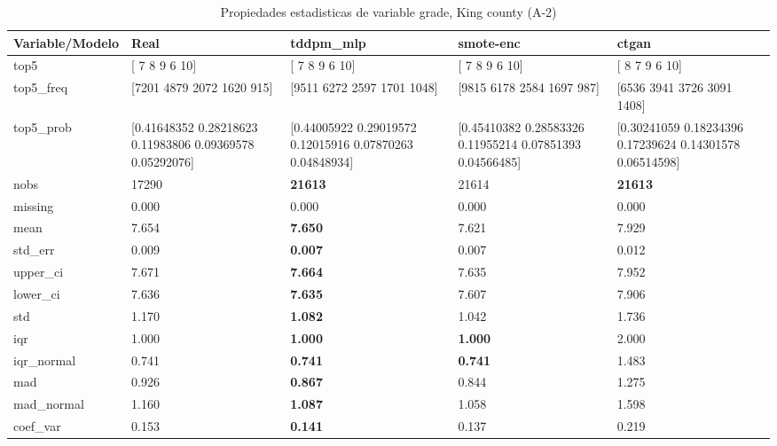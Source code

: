 \begin{table}[H]
\centering
\fontsize{8}{14}\selectfont
\caption{Propiedades  estadisticas de variable grade, King county (A-2)}
\label{table-stats-king county-a-2-grade}
\begin{tabular}{|l|m{10em}|m{10em}|m{10em}|m{10em}|}
\hline
 \rowcolor[gray]{0.8}
Variable/Modelo & Real & tddpm\_mlp & smote-enc & ctgan \\
\hline top5 & [ 7  8  9  6 10] & [ 7  8  9  6 10] & [ 7  8  9  6 10] & [ 8  7  9  6 10] \\
\hline top5\_freq & [7201 4879 2072 1620  915] & [9511 6272 2597 1701 1048] & [9815 6178 2584 1697  987] & [6536 3941 3726 3091 1408] \\
\hline top5\_prob & [0.41648352 0.28218623 0.11983806 0.09369578 0.05292076] & [0.44005922 0.29019572 0.12015916 0.07870263 0.04848934] & [0.45410382 0.28583326 0.11955214 0.07851393 0.04566485] & [0.30241059 0.18234396 0.17239624 0.14301578 0.06514598] \\
\hline nobs & 17290 & \bfseries 21613 & \cellcolor[rgb]{0.9, 0.54, 0.52} 21614 & \bfseries 21613 \\
\hline missing & 0.000 & 0.000 & 0.000 & 0.000 \\
\hline mean & 7.654 & \bfseries 7.650 & 7.621 & \cellcolor[rgb]{0.9, 0.54, 0.52} 7.929 \\
\hline std\_err & 0.009 & \bfseries 0.007 & 0.007 & \cellcolor[rgb]{0.9, 0.54, 0.52} 0.012 \\
\hline upper\_ci & 7.671 & \bfseries 7.664 & 7.635 & \cellcolor[rgb]{0.9, 0.54, 0.52} 7.952 \\
\hline lower\_ci & 7.636 & \bfseries 7.635 & 7.607 & \cellcolor[rgb]{0.9, 0.54, 0.52} 7.906 \\
\hline std & 1.170 & \bfseries 1.082 & 1.042 & \cellcolor[rgb]{0.9, 0.54, 0.52} 1.736 \\
\hline iqr & 1.000 & \bfseries 1.000 & \bfseries 1.000 & \cellcolor[rgb]{0.9, 0.54, 0.52} 2.000 \\
\hline iqr\_normal & 0.741 & \bfseries 0.741 & \bfseries 0.741 & \cellcolor[rgb]{0.9, 0.54, 0.52} 1.483 \\
\hline mad & 0.926 & \bfseries 0.867 & 0.844 & \cellcolor[rgb]{0.9, 0.54, 0.52} 1.275 \\
\hline mad\_normal & 1.160 & \bfseries 1.087 & 1.058 & \cellcolor[rgb]{0.9, 0.54, 0.52} 1.598 \\
\hline coef\_var & 0.153 & \bfseries 0.141 & 0.137 & \cellcolor[rgb]{0.9, 0.54, 0.52} 0.219 \\

\end{tabular}
\end{table}
